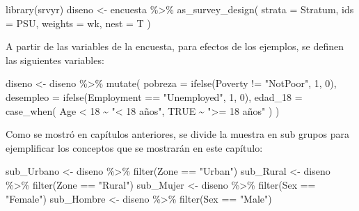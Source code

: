 \documentclass[
  12pt,
]{book}
\newenvironment{Shaded}{\begin{snugshade}}{\end{snugshade}}
\newcommand{\AttributeTok}[1]{\textcolor[rgb]{0.77,0.63,0.00}{#1}}
\newcommand{\ConstantTok}[1]{\textcolor[rgb]{0.00,0.00,0.00}{#1}}
\newcommand{\DecValTok}[1]{\textcolor[rgb]{0.00,0.00,0.81}{#1}}
\newcommand{\FunctionTok}[1]{\textcolor[rgb]{0.00,0.00,0.00}{#1}}
\newcommand{\NormalTok}[1]{#1}
\newcommand{\OtherTok}[1]{\textcolor[rgb]{0.56,0.35,0.01}{#1}}
\newcommand{\SpecialCharTok}[1]{\textcolor[rgb]{0.00,0.00,0.00}{#1}}
\newcommand{\StringTok}[1]{\textcolor[rgb]{0.31,0.60,0.02}{#1}}
\begin{document}
\begin{Shaded}
\begin{Highlighting}[]
\FunctionTok{library}\NormalTok{(srvyr)}
\NormalTok{diseno }\OtherTok{\textless{}{-}}\NormalTok{ encuesta }\SpecialCharTok{\%\textgreater{}\%}
  \FunctionTok{as\_survey\_design}\NormalTok{(}
    \AttributeTok{strata =}\NormalTok{ Stratum,}
    \AttributeTok{ids =}\NormalTok{ PSU,}
    \AttributeTok{weights =}\NormalTok{ wk,}
    \AttributeTok{nest =}\NormalTok{ T}
\NormalTok{  )}
\end{Highlighting}
\end{Shaded}

A partir de las variables de la encuesta, para efectos de los ejemplos, se definen las siguientes variables:

\begin{Shaded}
\begin{Highlighting}[]
\NormalTok{diseno }\OtherTok{\textless{}{-}}\NormalTok{ diseno }\SpecialCharTok{\%\textgreater{}\%} \FunctionTok{mutate}\NormalTok{(}
  \AttributeTok{pobreza =} \FunctionTok{ifelse}\NormalTok{(Poverty }\SpecialCharTok{!=} \StringTok{"NotPoor"}\NormalTok{, }\DecValTok{1}\NormalTok{, }\DecValTok{0}\NormalTok{),}
  \AttributeTok{desempleo =} \FunctionTok{ifelse}\NormalTok{(Employment }\SpecialCharTok{==} \StringTok{"Unemployed"}\NormalTok{, }\DecValTok{1}\NormalTok{, }\DecValTok{0}\NormalTok{),}
  \AttributeTok{edad\_18 =} \FunctionTok{case\_when}\NormalTok{(}
\NormalTok{    Age }\SpecialCharTok{\textless{}} \DecValTok{18} \SpecialCharTok{\textasciitilde{}} \StringTok{"\textless{} 18 años"}\NormalTok{,}
    \ConstantTok{TRUE} \SpecialCharTok{\textasciitilde{}} \StringTok{"\textgreater{}= 18 años"}
\NormalTok{  )}
\NormalTok{)}
\end{Highlighting}
\end{Shaded}

Como se mostró en capítulos anteriores, se divide la muestra en sub grupos para ejemplificar los conceptos que se mostrarán en este capítulo:

\begin{Shaded}
\begin{Highlighting}[]
\NormalTok{sub\_Urbano }\OtherTok{\textless{}{-}}\NormalTok{ diseno }\SpecialCharTok{\%\textgreater{}\%} \FunctionTok{filter}\NormalTok{(Zone }\SpecialCharTok{==} \StringTok{"Urban"}\NormalTok{)}
\NormalTok{sub\_Rural }\OtherTok{\textless{}{-}}\NormalTok{ diseno }\SpecialCharTok{\%\textgreater{}\%} \FunctionTok{filter}\NormalTok{(Zone }\SpecialCharTok{==} \StringTok{"Rural"}\NormalTok{)}
\NormalTok{sub\_Mujer }\OtherTok{\textless{}{-}}\NormalTok{ diseno }\SpecialCharTok{\%\textgreater{}\%} \FunctionTok{filter}\NormalTok{(Sex }\SpecialCharTok{==} \StringTok{"Female"}\NormalTok{)}
\NormalTok{sub\_Hombre }\OtherTok{\textless{}{-}}\NormalTok{ diseno }\SpecialCharTok{\%\textgreater{}\%} \FunctionTok{filter}\NormalTok{(Sex }\SpecialCharTok{==} \StringTok{"Male"}\NormalTok{)}
\end{Highlighting}
\end{Shaded}
\end{document}
